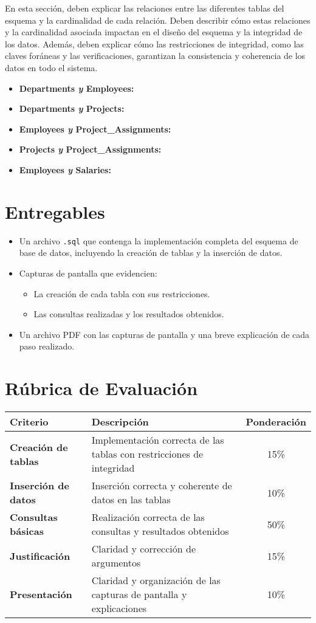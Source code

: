 En esta sección, deben explicar las relaciones entre las diferentes tablas del esquema y la cardinalidad de cada relación. 
Deben describir cómo estas relaciones y la cardinalidad asociada impactan en el diseño del esquema y la integridad de los datos. Además, deben explicar cómo las restricciones de integridad, como las claves foráneas y las verificaciones, garantizan la consistencia y coherencia de los datos en todo el sistema.
\begin{itemize}
    \item \textbf{Departments \textit{y} Employees:} 
    \item \textbf{Departments \textit{y} Projects:} 
    \item \textbf{Employees \textit{y} Project\_Assignments:} 
    \item \textbf{Projects \textit{y} Project\_Assignments:} 
    \item \textbf{Employees \textit{y} Salaries:} 
\end{itemize}
\section*{Entregables}

\begin{itemize}
    \item Un archivo \texttt{.sql} que contenga la implementación completa del esquema de base de datos, incluyendo la creación de tablas y la inserción de datos.
    \item Capturas de pantalla que evidencien:
    \begin{itemize}
        \item La creación de cada tabla con sus restricciones.
        \item Las consultas realizadas y los resultados obtenidos.
    \end{itemize}
    \item Un archivo PDF con las capturas de pantalla y una breve explicación de cada paso realizado.
\end{itemize}

\section*{Rúbrica de Evaluación}

\begin{tabular}{|l|l|c|}
\hline
\textbf{Criterio} & \textbf{Descripción} & \textbf{Ponderación} \\
\hline
\textbf{Creación de tablas} & Implementación correcta de las tablas con restricciones de integridad & 15\% \\
\hline
\textbf{Inserción de datos} & Inserción correcta y coherente de datos en las tablas & 10\% \\
\hline
\textbf{Consultas básicas} & Realización correcta de las consultas y resultados obtenidos & 50\% \\
\hline
\textbf{Justificación} & Claridad y corrección de argumentos & 15\% \\
\hline
\textbf{Presentación} & Claridad y organización de las capturas de pantalla y explicaciones & 10\% \\
\hline
\end{tabular}


